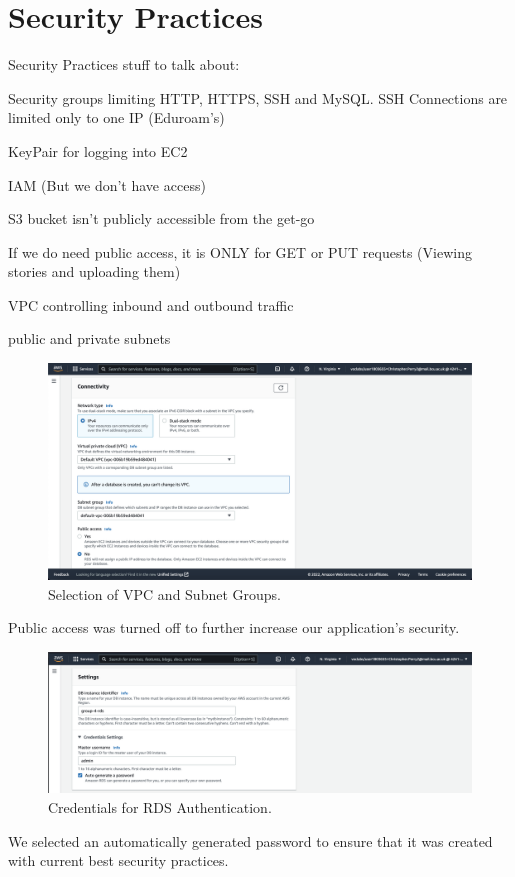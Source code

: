 \chapter{Security Practices}\label{ch:security-practices}
Security Practices stuff to talk about:

Security groups limiting HTTP, HTTPS, SSH and MySQL. SSH Connections are limited only to one IP (Eduroam's)

KeyPair for logging into EC2

IAM (But we don't have access)

S3 bucket isn't publicly accessible from the get-go

If we do need public access, it is ONLY for GET or PUT requests (Viewing stories and uploading them)

VPC controlling inbound and outbound traffic

public and private subnets

\begin{figure}[!htbp]
    \centering
    \includegraphics[width=\textwidth]{resources/rds/rds-connectivity-1}
    \caption{Selection of VPC and Subnet Groups.}
    \label{fig:rds-connect-2}
\end{figure}

Public access was turned off to further increase our application's security.

\begin{figure}
    \centering
    \includegraphics[width=\textwidth]{resources/rds/rds-settings}
    \caption{Credentials for RDS Authentication.}
    \label{fig:rds-settings-2}
\end{figure}

We selected an automatically generated password to ensure that it was created with current best security practices.